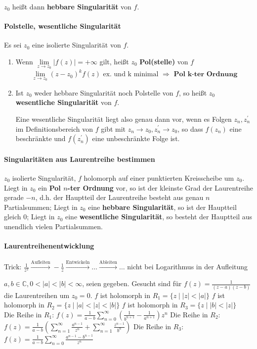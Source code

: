\documentclass[a4paper, 10pt, DIV20, headings=small]{scrartcl}
\theoremstyle{definition}
\theoremstyle{plain}
\begin{document}
$z_0$ heißt dann \textbf{hebbare Singularität} von $f$.

\paragraph{Polstelle, wesentliche Singularität}
Es sei $z_0$ eine isolierte Singularität von $f$.
\begin{enumerate}
\item Wenn $\lim\limits_{z \rightarrow z_0} |f(z)| = + \infty$ gilt, heißt $z_0$ \textbf{Pol(stelle)} von $f$
$$\lim\limits_{z \to z_0} (z-z_0)^k f(z) \text{ ex. und k minimal } \Rightarrow \textbf{ Pol k-ter Ordnung}$$
\item Ist $z_0$ weder hebbare Singularität noch Polstelle von $f$, so heißt $z_0$ \textbf{wesentliche Singularität} von $f$.

Eine wesentliche Singularität liegt also genau dann vor, wenn es Folgen $z_n, z_n^\prime$ im
Definitionsbereich von $f$ gibt mit $z_n \rightarrow z_0, z_n^\prime \rightarrow z_0$, so dass $f(z_n)$ eine beschränkte und $f(z_n^\prime)$ eine unbeschränkte Folge ist.

\end{enumerate}

\paragraph{Singularitäten aus Laurentreihe bestimmen}
$z_0$ isolierte Singularität, $f$ holomorph auf einer punktierten Kreisscheibe um $z_0$.
	Liegt in $z_0$ ein \textbf{Pol $n$-ter Ordnung} vor, so ist der kleinste Grad der Laurentreihe gerade $-n$, d.h. der Hauptteil der Laurentreihe besteht aus genau $n$ Partialsummen; 
	Liegt in $z_0$ eine \textbf{hebbare Singularität}, so ist der Hauptteil gleich $0$; 
	Liegt in $z_0$ eine \textbf{wesentliche Singularität}, so besteht der Hauptteil aus unendlich vielen Partialsummen.

\paragraph{Laurentreihenentwicklung}
Trick: $\frac{1}{z^2} \overset{\text{Aufleiten}}{\rightarrow} -\frac{1}{z} \overset{\text{Entwickeln}}{\rightarrow} \ldots \overset{\text{Ableiten}}{\rightarrow} \ldots$ nicht bei Logarithmus in der Aufleitung
\newline

$a, b \in \mathbb{C}, 0 < |a| < |b| < \infty$, seien gegeben.
Gesucht sind für $f(z) = \frac{1}{(z-a)(z-b)}$ die Laurentreihen um $z_0 = 0$. 
$f$ ist holomorph in $R_1 = \{z \mid |z| < |a|\}$
$f$ ist holomorph in $R_2 = \{ z \mid |a| < |z| <|b|\}$
$f$ ist holomorph in $R_3 = \{z \mid |b| < |z|\}$\\
Die Reihe in $R_1$: $f(z) = \frac{1}{a-b} \sum\limits_{n=0}^\infty{\left(\frac{1}{b^{n+1}}- \frac{1}{a^{n+1}}\right) z^n}$
Die Reihe in $R_2$:  $f(z) = \frac{1}{a-b} \left( \sum\limits_{n=1}^\infty{\frac{a^{n-1}}{z^n}} + \sum\limits_{n=1}^\infty{\frac{z^{n-1}}{b^n}}\right)$
Die Reihe in $R_3$: $f(z) = \frac{1}{a-b} \sum\limits_{n=0}^\infty{\frac{a^ {n-1}-b^{n-1}}{z^n}}$
\end{document}
